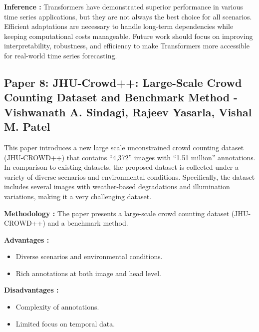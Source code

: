 \documentclass[11pt]{report}
\begin{document}
\textbf{Inference : }
Transformers have demonstrated superior performance in various time series applications, but they are not always the best choice for all scenarios. Efficient adaptations are necessary to handle long-term dependencies while keeping computational costs manageable. Future work should focus on improving interpretability, robustness, and efficiency to make Transformers more accessible for real-world time series forecasting.
\subsection{Paper 8: JHU-Crowd++: Large-Scale Crowd Counting Dataset and Benchmark Method - Vishwanath A. Sindagi, Rajeev Yasarla, Vishal M. Patel}

This paper introduces a new large scale unconstrained crowd counting dataset (JHU-CROWD++) that contains “4,372” images with “1.51 million” annotations. In comparison to existing datasets, the proposed dataset is collected under a variety of diverse scenarios and environmental conditions. Specifically, the dataset includes several images with weather-based degradations and illumination variations, making it a very challenging dataset.  \par

\textbf{Methodology : }  
The paper presents a large-scale crowd counting dataset (JHU-CROWD++) and a benchmark method.

\textbf{Advantages : }  
\begin{itemize}
    \item Diverse scenarios and environmental conditions.  
    \item Rich annotations at both image and head level.
\end{itemize}

\textbf{Disadvantages : }  
\begin{itemize}
    \item Complexity of annotations.  
    \item Limited focus on temporal data.
    
\end{itemize}
\end{document}
